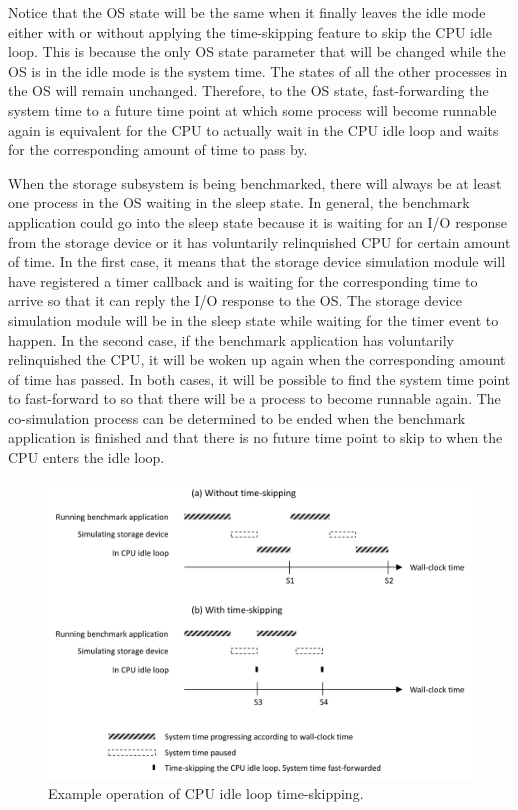 Notice that the OS state will be the same when it finally leaves the idle mode either with or without applying the time-skipping feature to skip the CPU idle loop. This is because the only OS state parameter that will be changed while the OS is in the idle mode is the system time. The states of all the other processes in the OS will remain unchanged. Therefore, to the OS state, fast-forwarding the system time to a future time point at which some process will become runnable again is equivalent for the CPU to actually wait in the CPU idle loop and waits for the corresponding amount of time to pass by.

When the storage subsystem is being benchmarked, there will always be at least one process in the OS waiting in the sleep state. In general, the benchmark application could go into the sleep state because it is waiting for an I/O response from the storage device or it has voluntarily relinquished CPU for certain amount of time. In the first case, it means that the storage device simulation module will have registered a timer callback and is waiting for the corresponding time to arrive so that it can reply the I/O response to the OS. The storage device simulation module will be in the sleep state while waiting for the timer event to happen. In the second case, if the benchmark application has voluntarily relinquished the CPU, it will be woken up again when the corresponding amount of time has passed. In both cases, it will be possible to find the system time point to fast-forward to so that there will be a process to become runnable again. The co-simulation process can be determined to be ended when the benchmark application is finished and that there is no future time point to skip to when the CPU enters the idle loop.

\begin{figure}[htpb]
	\centering
	\includegraphics[width=1\textwidth]{figures/ch3-time-skipping.pdf}
	\caption{\label{fig:ch3-time-skipping}Example operation of CPU idle loop time-skipping.}
\end{figure}

